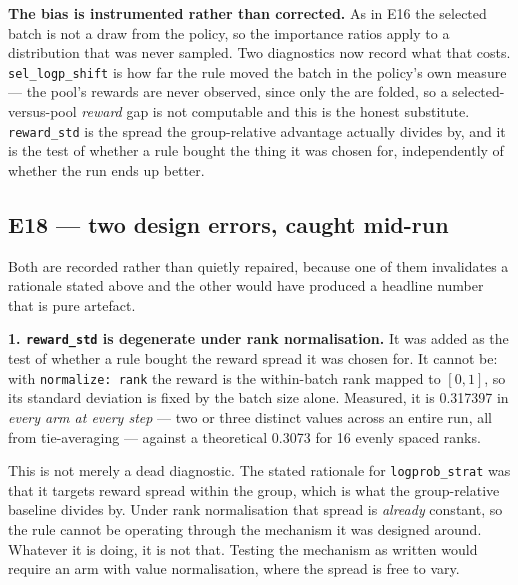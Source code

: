 \textbf{The bias is instrumented rather than corrected.} As in E16 the selected
batch is not a draw from the policy, so the importance ratios apply to a
distribution that was never sampled. Two diagnostics now record what that
costs. \texttt{sel\_logp\_shift} is how far the rule moved the batch in the
policy's own measure --- the pool's rewards are never observed, since only the
 are folded, so a selected-versus-pool \emph{reward} gap is not
computable and this is the honest substitute. \texttt{reward\_std} is the
spread the group-relative advantage actually divides by, and it is the test of
whether a rule bought the thing it was chosen for, independently of whether the
run ends up better.


\subsection*{E18 --- two design errors, caught mid-run}

Both are recorded rather than quietly repaired, because one of them invalidates
a rationale stated above and the other would have produced a headline number
that is pure artefact.

\textbf{1. \texttt{reward\_std} is degenerate under rank normalisation.} It was
added as the test of whether a rule bought the reward spread it was chosen for.
It cannot be: with \texttt{normalize: rank} the reward is the within-batch rank
mapped to $[0,1]$, so its standard deviation is fixed by the batch size alone.
Measured, it is \num{0.317397} in \emph{every arm at every step} --- two or
three distinct values across an entire run, all from tie-averaging --- against
a theoretical \num{0.3073} for 16 evenly spaced ranks.

This is not merely a dead diagnostic. The stated rationale for
\texttt{logprob\_strat} was that it targets reward spread within the group,
which is what the group-relative baseline divides by. Under rank normalisation
that spread is \emph{already} constant, so the rule cannot be operating through
the mechanism it was designed around. Whatever it is doing, it is not that.
Testing the mechanism as written would require an arm with value normalisation,
where the spread is free to vary.

